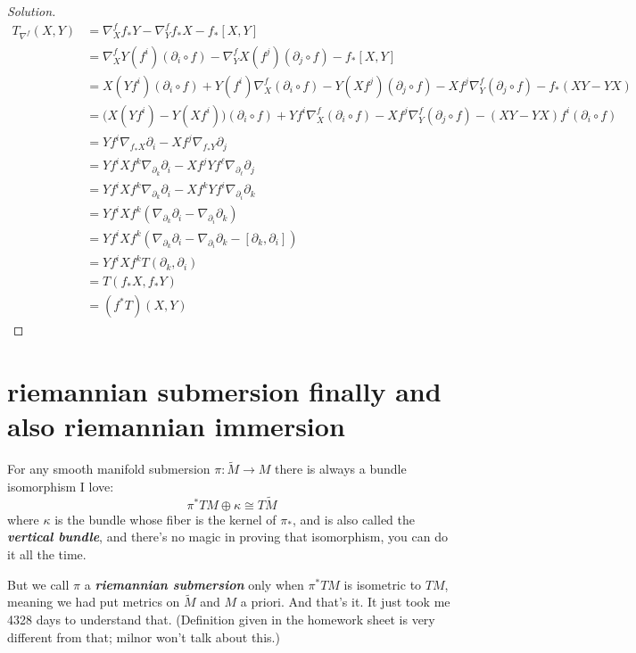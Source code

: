 \begin{proof}[Solution]

\begin{align*}
	T_{\nabla^f}(X,Y)&=\nabla^f_X f_*Y-\nabla^f_Yf_*X-f_*[X,Y]\\
			 &=\nabla^f_XY(f^i)(\partial_i \circ f)-\nabla^f_YX(f^j)(\partial_j\circ f)-f_*[X,Y]\\
			 &=X(Yf^i)(\partial_i \circ f)+Y(f^i)\nabla^f_X(\partial_i \circ f)-Y(Xf^j)(\partial_j\circ f)-Xf^j \nabla^f_Y (\partial_j \circ f)-f_*(XY-YX)\\
			 &=\Big(X(Yf^i)-Y(Xf^i)\Big)(\partial_i \circ f)+Yf^i\nabla^f_X(\partial_i \circ f)-Xf^j\nabla^f_Y(\partial_j \circ f)-(XY-YX)f^i(\partial_i \circ f)\\
			 &=Yf^i \nabla_{f_*X}\partial_i-Xf^j \nabla_{f_*Y}\partial_j\\
&=Yf^iXf^k\nabla_{\partial_k}\partial_i-Xf^jYf^\ell \nabla_{\partial_\ell}\partial_j\\
&=Yf^iXf^k \nabla_{\partial_k}\partial_i-Xf^kYf^i \nabla_{\partial_i}\partial_k\\
&=Yf^iXf^k(\nabla_{\partial_k}\partial_i-\nabla_{\partial_i}\partial_k)\\
&=Yf^iXf^k(\nabla_{\partial_k}\partial_i-\nabla_{\partial_i}\partial_k-[\partial_k,\partial_i])\\
&=Yf^iXf^kT(\partial_k,\partial_i)\\
&=T(f_*X,f_*Y)\\
&=(f^*T)(X,Y)
\end{align*}
\end{proof}



\section{riemannian submersion finally and also riemannian immersion}

For any smooth manifold submersion \(\pi:\widetilde{M}\to M\) there is always a bundle isomorphism I love:
\[\pi^*TM \oplus \kappa\cong T\widetilde{M}\]
where \(\kappa\) is the bundle whose fiber is the kernel of \(\pi_*\), and is also called the \textit{\textbf{vertical bundle}}, and there's no magic in proving that isomorphism, you can do it all the time.

 But we call \(\pi\) a \textit{\textbf{riemannian submersion}} only when \(\pi^*TM\) is isometric to \(TM\), meaning we had put metrics on \(\widetilde{M}\) and \(M\) a priori. And that's it. It just took me 4328 days to understand that. (Definition given in the homework sheet is very different from that; milnor won't talk about this.)


